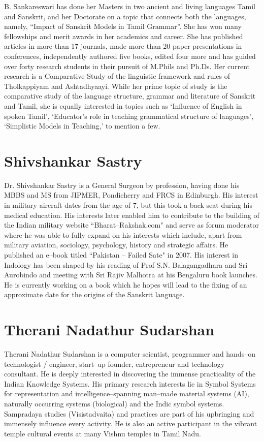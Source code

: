 B. Sankareswari has done her Masters in two ancient and living languages Tamil and Sanskrit, and her Doctorate on a topic that connects both the languages, namely, “Impact of Sanskrit Models in Tamil Grammar”. She has won many fellowships and merit awards in her academics and career. She has published articles in more than 17 journals, made more than 20 paper presentations in conferences, independently authored five books, edited four more and has guided over forty research students in their pursuit of M.Phils and Ph.Ds. Her current research is a Comparative Study of the linguistic framework and rules of Tholkappiyam and Ashtadhyaayi. While her prime topic of study is the comparative study of the language structure, grammar and literature of Sanskrit and Tamil, she is equally interested in topics such as ‘Influence of English in spoken Tamil’, ‘Educator’s role in teaching grammatical structure of languages’, ‘Simplistic Models in Teaching,’ to mention a few.

\section*{Shivshankar Sastry}

Dr. Shivshankar Sastry is a General Surgeon by profession, having done his MBBS and MS from JIPMER, Pondicherry and FRCS in Edinburgh. His interest in military aircraft dates from the age of 7, but this took a back seat during his medical education. His interests later enabled him to contribute to the building of the Indian military website “Bharat–Rakshak.com" and serve as forum moderator where he was able to fully expand on his interests which include, apart from military aviation, sociology, psychology, history and strategic affairs. He published an e–book titled “Pakistan – Failed Sate" in 2007. His interest in Indology has been shaped by his reading of Prof S.N. Balagangadhara and Sri Aurobindo and meeting with Sri Rajiv Malhotra at his Bengaluru book launches. He is currently working on a book which he hopes will lead to the fixing of an approximate date for the origins of the Sanskrit language.

\section*{Therani Nadathur Sudarshan}

Therani Nadathur Sudarshan is a computer scientist, programmer and hands–on technologist / engineer, start–up founder, entrepreneur and technology consultant. He is deeply interested in discovering the immense practicality of the Indian Knowledge Systems. His primary\break
 research interests lie in Symbol Systems for representation and\break
 intelligence–spanning man–made material systems (AI), naturally occurring systems (biological) and the Indic symbol systems. Sampradaya studies (Visistadvaita) and practices are part of his upbringing and immensely influence every activity. He is also an active participant in the vibrant temple cultural events at many Vishnu temples in Tamil Nadu.

